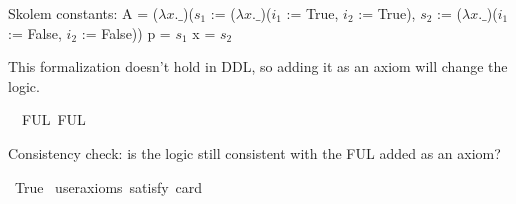 \begin{isabellebody}
{  Skolem constants:
    A = ($\lambda x. \_$)($s_1$ := ($\lambda x. \_$)($i_1$ := True, $i_2$ := True), $s_2$ := ($\lambda x. \_$)($i_1$ := False, $i_2$ := False))
    p = $s_1$
    x = $s_2$\color{black}%
}%
\endisatagproof
{\isafoldproof}%
%
\isadelimproof
%
\endisadelimproof
%
\begin{isamarkuptext}%
This formalization doesn't hold in DDL, so adding it as an axiom will change the logic.%
\end{isamarkuptext}\isamarkuptrue%
\isamarkupfalse%
\ \ FUL{\isacharcolon}\ FUL%
\begin{isamarkuptext}%
Consistency check: is the logic still consistent with the FUL added as an axiom?%
\end{isamarkuptext}\isamarkuptrue%
\isamarkupfalse%
\ True\ \isamarkupfalse%
{\isacharbrackleft}user{\isacharunderscore}axioms{\isacharcomma}\ satisfy{\isacharcomma}\ card{\isacharequal}{}{\isacharbrackright}%
\isadelimproof
\ %
\endisadelimproof
%
\isatagproof
{}\isamarkupfalse%
\isanewline
%
\end{isabellebody}
